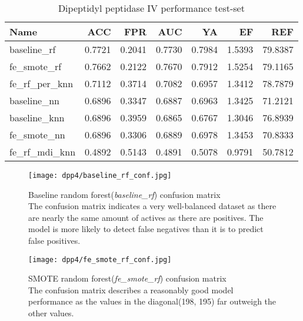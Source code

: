 \begin{table}[H]
    \begin{center}
        \caption{Dipeptidyl peptidase IV performance test-set}
        \begin{tabular}{lrrrrrr}
            \toprule
            Name             & ACC    & FPR    & AUC    & YA     & EF     & REF     \\
            \midrule
            baseline\_rf     & 0.7721 & 0.2041 & 0.7730 & 0.7984 & 1.5393 & 79.8387 \\
            fe\_smote\_rf    & 0.7662 & 0.2122 & 0.7670 & 0.7912 & 1.5254 & 79.1165 \\
            fe\_rf\_per\_knn & 0.7112 & 0.3714 & 0.7082 & 0.6957 & 1.3412 & 78.7879 \\
            baseline\_nn     & 0.6896 & 0.3347 & 0.6887 & 0.6963 & 1.3425 & 71.2121 \\
            baseline\_knn    & 0.6896 & 0.3959 & 0.6865 & 0.6767 & 1.3046 & 76.8939 \\
            fe\_smote\_nn    & 0.6896 & 0.3306 & 0.6889 & 0.6978 & 1.3453 & 70.8333 \\
            fe\_rf\_mdi\_knn & 0.4892 & 0.5143 & 0.4891 & 0.5078 & 0.9791 & 50.7812 \\
            \bottomrule
        \end{tabular}
    \end{center}
\end{table}

\begin{figure}[H]
    \begin{center}
        \captionsetup{justification=centering}
        \texttt{[image: dpp4/baseline\_rf\_conf.jpg]}
        \caption[]{Baseline random forest(\textit{baseline\_rf}) confusion matrix\\
            The confusion matrix indicates a very well-balanced dataset as there are nearly the same amount of actives as there are positives. The model is more likely to detect false negatives than it is to predict false positives.
        }
        \label{fig:dpp4_baseline_rf_conf}
    \end{center}
\end{figure}
\begin{figure}[H]
    \begin{center}
        \captionsetup{justification=centering}
        \texttt{[image: dpp4/fe\_smote\_rf\_conf.jpg]}
        \caption[]{SMOTE random forest(\textit{fe\_smote\_rf}) confusion matrix\\
            The confusion matrix describes a reasonably good model performance as the values in the diagonal(198, 195) far outweigh the other values.
        }
        \label{fig:dpp4_smote_rf_conf}
    \end{center}

\end{figure}

